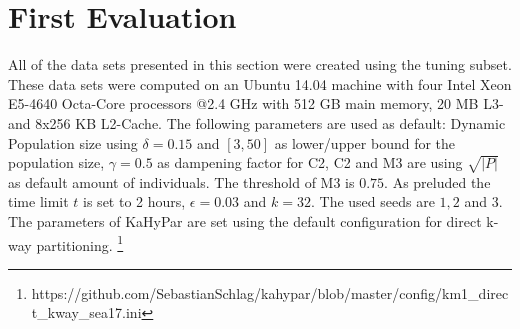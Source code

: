 \documentclass[a4paper,12pt,titlepage, BCOR7mm,headsepline]{scrbook}
\numberwithin{equation}{section}
\begin{document}
\section{First Evaluation} 
All of the data sets presented in this section were created using the tuning subset. These data sets were computed on an Ubuntu 14.04 machine with four Intel Xeon E5-4640 Octa-Core processors @2.4 GHz with 512 GB main memory, 20 MB L3- and 8x256 KB L2-Cache. The following parameters are used as default: Dynamic Population size using $\delta = 0.15$ and $[3,50]$ as lower/upper bound for the population size, $\gamma = 0.5$ as dampening factor for C2, C2 and M3 are using $\sqrt{|P|}$ as default amount of individuals. The threshold of M3 is $0.75$. As preluded the time limit $t$ is set to 2 hours, $\epsilon = 0.03$ and $k=32$. The used seeds are $1,2$ and $3$. The parameters of KaHyPar are set using the default configuration for direct k-way partitioning. \footnote{https://github.com/SebastianSchlag/kahypar/blob/master/config/km1\_direct\_kway\_sea17.ini}
\end{document}
